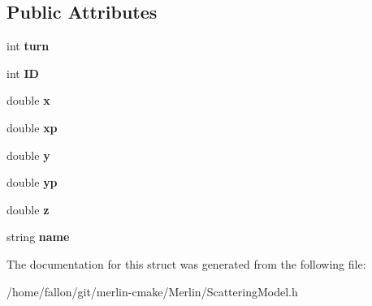 \subsection*{Public Attributes}
\begin{DoxyCompactItemize}
\item 
\mbox{\label{structCollimation_1_1ScatterPlotData_afee53dea3f31c85949ab0398e5c70a54}} 
int {\bfseries turn}
\item 
\mbox{\label{structCollimation_1_1ScatterPlotData_a844affe5d1bf1c89091589a7ab44bcf7}} 
int {\bfseries ID}
\item 
\mbox{\label{structCollimation_1_1ScatterPlotData_a66369b62e64d1988e2b93db49ad8d56f}} 
double {\bfseries x}
\item 
\mbox{\label{structCollimation_1_1ScatterPlotData_aea830de735d67e5ce84b7e6ea65c67a2}} 
double {\bfseries xp}
\item 
\mbox{\label{structCollimation_1_1ScatterPlotData_a5d05fce3b7d642c26cc456bd7ac1e9e7}} 
double {\bfseries y}
\item 
\mbox{\label{structCollimation_1_1ScatterPlotData_a590732e04ec5b9930088359a4d660f1c}} 
double {\bfseries yp}
\item 
\mbox{\label{structCollimation_1_1ScatterPlotData_af264051c7eb5a9816e68dde0451d0319}} 
double {\bfseries z}
\item 
\mbox{\label{structCollimation_1_1ScatterPlotData_a68c220b947b92c6aa2a610e23064465d}} 
string {\bfseries name}
\end{DoxyCompactItemize}


The documentation for this struct was generated from the following file\+:\begin{DoxyCompactItemize}
\item 
/home/fallon/git/merlin-\/cmake/\+Merlin/Scattering\+Model.\+h\end{DoxyCompactItemize}
